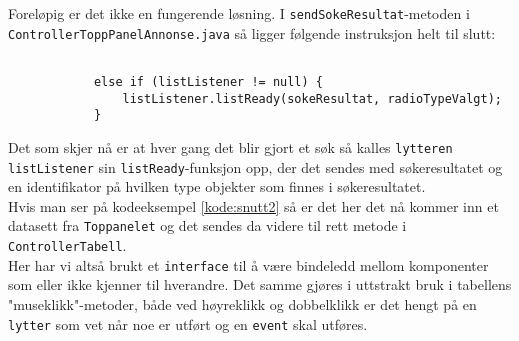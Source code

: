 Foreløpig er det ikke en fungerende løsning. I \texttt{sendSokeResultat}-metoden i \texttt{ControllerToppPanelAnnonse.java} så ligger følgende instruksjon helt til slutt:
\begin{lstlisting}[caption=Utdrag fra \texttt{sendSokeResultat}-metoden i \texttt{ControllerToppPanelAnnonse.java},label=kode:snutt3]

            else if (listListener != null) {
                listListener.listReady(sokeResultat, radioTypeValgt);
            }
\end{lstlisting}

Det som skjer nå er at hver gang det blir gjort et søk så kalles \texttt{lytteren listListener} sin \texttt{listReady}-funksjon opp, der det sendes med søkeresultatet og en identifikator på hvilken type objekter som finnes i søkeresultatet.\\
Hvis man ser på kodeeksempel \ref{kode:snutt2} så er det her det nå kommer inn et datasett fra \texttt{Toppanelet} og det sendes da videre til rett metode i \texttt{ControllerTabell}.\\
Her har vi altså brukt et \texttt{interface} til å være bindeledd mellom komponenter som eller ikke kjenner til hverandre. Det samme gjøres i uttstrakt bruk i tabellens "museklikk"-metoder, både ved høyreklikk og dobbelklikk er det hengt på en \texttt{lytter} som vet når noe er utført og en \texttt{event} skal utføres.
 
